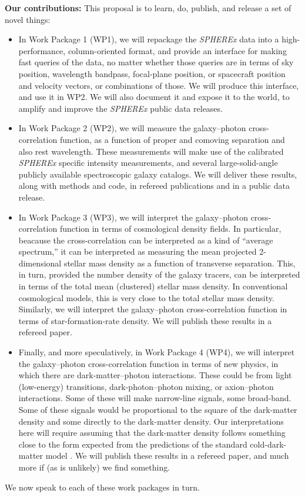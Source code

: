 \documentclass[12pt]{article}
\newcommand{\paragraphskip}{\medskip}
\renewcommand{\paragraph}[1]{\par\paragraphskip\noindent\textbf{#1}}
\begin{document}
\paragraph{Our contributions:}
This proposal is to learn, do, publish, and release a set of novel things:
\begin{itemize}
    \item In Work Package 1 (WP1), we will repackage the \textsl{SPHEREx} data into a high-performance, column-oriented format, and provide an interface for making fast queries of the data, no matter whether those queries are in terms of sky position, wavelength bandpass, focal-plane position, or spacecraft position and velocity vectors, or combinations of those.
    We will produce this interface, and use it in WP2.
    We will also document it and expose it to the world, to amplify and improve the \textsl{SPHEREx} public data releases.
    \item In Work Package 2 (WP2), we will measure the galaxy--photon cross-correlation function, as a function of proper and comoving separation and also rest wavelength.
    These measurements will make use of the calibrated \textsl{SPHEREx} specific intensity measurements, and several large-solid-angle publicly available spectroscopic galaxy catalogs.
    We will deliver these results, along with methods and code, in refereed publications and in a public data release.
    \item In Work Package 3 (WP3), we will interpret the galaxy--photon cross-correlation function in terms of cosmological density fields.
    In particular, beacause the cross-correlation can be interpreted as a kind of ``average spectrum,'' it can be interpreted as measuring the mean projected 2-dimensional stellar mass density as a function of transverse separation.
    This, in turn, provided the number density of the galaxy tracers, can be interpreted in terms of the total mean (clustered) stellar mass density.
    In conventional cosmological models, this is very close to the total stellar mass density.
    Similarly, we will interpret the galaxy--photon cross-correlation function in terms of star-formation-rate density.
    We will publish these results in a refereed paper.
    \item Finally, and more speculatively, in Work Package 4 (WP4), we will interpret the galaxy--photon cross-correlation function in terms of new physics, in which there are dark-matter--photon interactions.
    These could be from light (low-energy) transitions, dark-photon--photon mixing, or axion--photon interactions.
    Some of these will make narrow-line signals, some broad-band.
    Some of these signals would be proportional to the square of the dark-matter density and some directly to the dark-matter density.
    Our interpretations here will require assuming that the dark-matter density follows something close to the form expected from the predictions of the standard cold-dark-matter model \citep{lcdm}.
    We will publish these results in a refereed paper, and much more if (as is unlikely) we find something.
\end{itemize}
We now speak to each of these work packages in turn.
\end{document}
